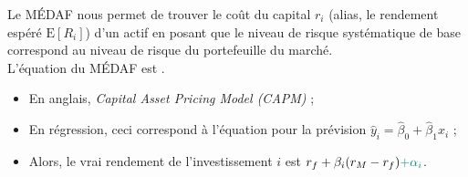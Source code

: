 \documentclass[10pt, french]{article}
\begin{document}
\begin{multicols*}{2}
\begin{center}
\begin{tikzpicture}[x=0.75pt,y=0.75pt,yscale=-1,xscale=1]
\end{tikzpicture}
\end{center}

\begin{definitionNOHFILL}
Le MÉDAF nous permet de trouver le coût du capital $r_{i}$ (alias, le rendement espéré $\text{E}[R_{i}]$) d'un actif en posant que le niveau de risque systématique de base correspond au niveau de risque du portefeuille du marché. \\

L'équation du MÉDAF est .

\begin{itemize}
	\item	En anglais, \og \textit{Capital Asset Pricing Model (CAPM)} \fg{} ;
	\item	En régression, ceci correspond à l'équation pour la prévision $\hat{y}_{i}	=	\hat{\beta}_{0} + \hat{\beta}_{1}x_{i}$ ;
	\item	Alors, le vrai rendement de l'investissement $i$ est $r_{f} + \beta_{i}(r_{M} -  r_{f}) \textcolor{teal}{+ \alpha_{i}}$.
\end{itemize}
\end{definitionNOHFILL}


\end{multicols*}
\end{document}

